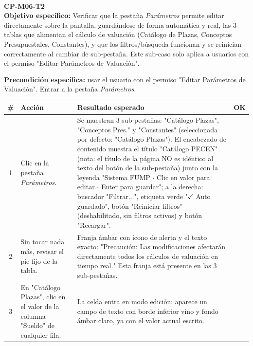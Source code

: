 \documentclass[11pt]{article}
\newcommand{\subcaso}[2]{%
  \vspace{10pt}
  \noindent{\color{vino}\rule{\linewidth}{2.2pt}}\\[4pt]
  {\Large\color{vino}\textbf{#1}} \quad {\large\color{oro}\textbf{#2}}\\[4pt]
}
\newcommand{\chk}[1]{\CheckBox[name=#1,width=11pt,height=11pt,bordercolor=grisborde,backgroundcolor=1 1 1]{}}
\begin{document}
\begin{Form}
\subcaso{CP-M06-T2}{Parámetros de Valuación}

\textbf{Objetivo específico:} Verificar que la pestaña \emph{Parámetros} permite editar
directamente sobre la pantalla, guardándose de forma automática y real, las 3 tablas que alimentan
el cálculo de valuación (Catálogo de Plazas, Conceptos Presupuestales, Constantes), y que los
filtros/búsqueda funcionan y se reinician correctamente al cambiar de sub-pestaña. Este sub-caso
solo aplica a usuarios con el permiso "Editar Parámetros de Valuación".

\vspace{4pt}\noindent\textbf{Precondición específica:} usar el usuario con el permiso "Editar
Parámetros de Valuación". Entrar a la pestaña \emph{Parámetros}.

\begingroup\small
\begin{longtable}{|c|p{6.7cm}|p{6.7cm}|c|}
\hline
\rowcolor{grisclaro}
\textbf{\#} & \textbf{Acción} & \textbf{Resultado esperado} & \textbf{OK} \\ \hline
\endhead

1 &
Clic en la pestaña \emph{Parámetros}. &
Se muestran 3 sub-pestañas: "Catálogo Plazas", "Conceptos Pres." y "Constantes" (seleccionada por
defecto: "Catálogo Plazas"). El encabezado de contenido muestra el título "Catálogo PECEN" (nota: el
título de la página NO es idéntico al texto del botón de la sub-pestaña) junto con la leyenda
"Sistema FUMP $\cdot$
Clic en valor para editar $\cdot$ Enter para guardar"; a la derecha: buscador "Filtrar...", etiqueta verde
"$\checkmark$ Auto guardado", botón "Reiniciar filtros" (deshabilitado, sin filtros activos) y botón
"Recargar". &
\chk{t2r1} \\ \hline

2 &
Sin tocar nada más, revisar el pie fijo de la tabla. &
Franja ámbar con ícono de alerta y el texto exacto: "Precaución: Las modificaciones afectarán
directamente todos los cálculos de valuación en tiempo real." Esta franja está presente en las 3
sub-pestañas. &
\chk{t2r2} \\ \hline

3 &
En "Catálogo Plazas", clic en el valor de la columna "Sueldo" de cualquier fila. &
La celda entra en modo edición: aparece un campo de texto con borde inferior vino y fondo ámbar
claro, ya con el valor actual escrito. &
\chk{t2r3} \\ \hline


\end{longtable}
\end{Form}
\end{document}
